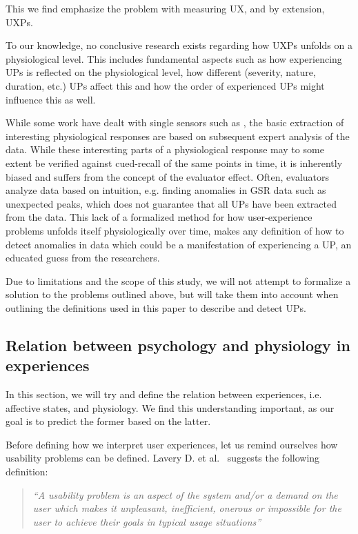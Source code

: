 This we find emphasize the problem with measuring UX, and by extension, UXPs.

To our knowledge, no conclusive research exists regarding how UXPs unfolds on a physiological level. This includes
fundamental aspects such as how experiencing UPs is reflected on the physiological level, how different (severity, nature,
duration, etc.) UPs affect this and how the order of experienced UPs might influence this as well.

While some work have dealt with single sensors such as \cite{mind_the_gap} \cite{LH-paper}, the basic extraction of
interesting physiological responses are based on subsequent expert analysis of the data.  While these interesting parts
of a physiological response may to some extent be verified against cued-recall of the same points in time, it is
inherently biased and suffers from the concept of the evaluator effect. Often, evaluators analyze data based on
intuition, e.g. finding anomalies in GSR data such as unexpected peaks, which does not guarantee that all UPs have been
extracted from the data.  This lack of a formalized method for how user-experience problems unfolds itself
physiologically over time, makes any definition of how to detect anomalies in data which could be a manifestation of
experiencing a UP, an educated guess from the researchers.

Due to limitations and the scope of this study, we will not attempt to formalize a solution to the problems outlined
above, but will take them into account when outlining the definitions used in this paper to describe and detect UPs.

\subsection{Relation between psychology and physiology in experiences}
In this section, we will try and define the relation between experiences, i.e. affective states, and physiology. We find
this understanding important, as our goal is to predict the former based on the latter.

Before defining how we interpret user experiences, let us remind ourselves how usability problems can be
defined. Lavery D. et al.~\cite[p. 254]{comp-eval-methods} suggests the following definition:

\begin{quotation}
  \textit{``A usability problem is an aspect of the system and/or a demand on the user which makes it unpleasant,
    inefficient, onerous or impossible for the user to achieve their goals in typical usage situations''} 
\end{quotation}

